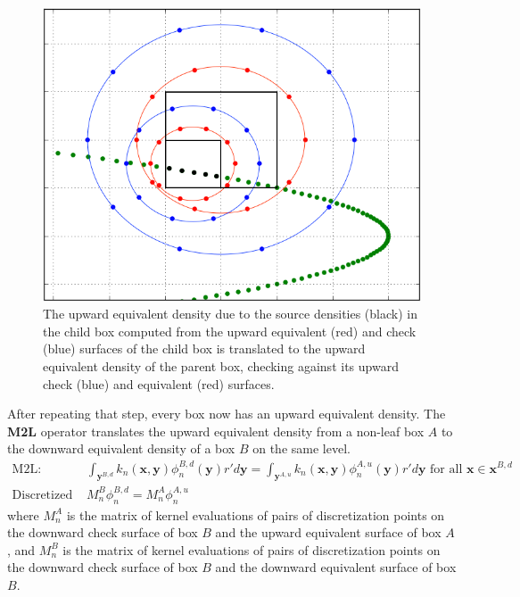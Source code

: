 \documentclass[12pt,letterpaper]{article}
\begin{document}
\begin{figure}[!ht]
\begin{center}
\includegraphics[scale=0.5]{M2M-curve}
\end{center}
\caption{The upward equivalent density due to the source densities (black) in the child box computed from the upward equivalent (red) and check (blue) surfaces of the child box is translated to the upward equivalent density of the parent box, checking against its upward check (blue) and equivalent (red) surfaces.}
\end{figure}

After repeating that step, every box now has an upward equivalent density. The \textbf{M2L} operator translates the upward equivalent density from a non-leaf box $A$ to the downward equivalent density of a box $B$ on the same level.
\begin{align}
\mbox{M2L: }&\int_{\mathbf{y}^{B,d}}{k_n(\mathbf{x},\mathbf{y})}\phi^{B,d}_n{(\mathbf{y})}r'd\mathbf{y} = \int_{\mathbf{y}^{A,u}}{k_n(\mathbf{x},\mathbf{y})}\phi^{A,u}_n{(\mathbf{y})}r'd\mathbf{y}\mbox{ for all }\mathbf{x}\in\mathbf{x}^{B,d}\\
\mbox{Discretized M2L: }&M_n^B\phi^{B,d}_n=M_n^A\phi^{A,u}_n
\end{align}
where $M_n^A$ is the matrix of kernel evaluations of pairs of discretization points on the downward check surface of box $B$ and the upward equivalent surface of box $A$, and $M_n^B$ is the matrix of kernel evaluations of pairs of discretization points on the downward check surface of box $B$ and the downward equivalent surface of box $B$.
\end{document}
